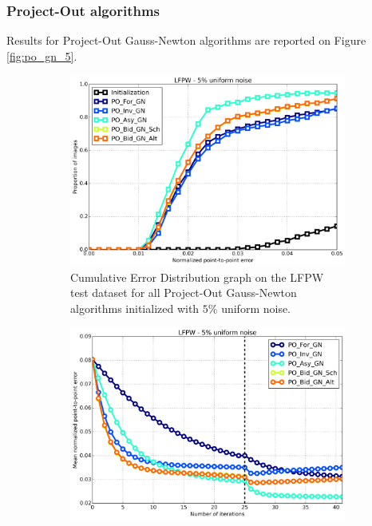 \subsubsection{Project-Out algorithms}


Results for Project-Out Gauss-Newton algorithms are reported on Figure \ref{fig:po_gn_5}.

\begin{figure}[h!]
	\centering
	\begin{subfigure}{0.48\textwidth}
	    \includegraphics[width=\textwidth]{experiments/algorithms/po_gn/ced_po_gn_5.png}
	    \caption{Cumulative Error Distribution graph on the LFPW test dataset for all Project-Out Gauss-Newton algorithms initialized with $5\%$ uniform noise.}
	    \label{fig:ced_po_gn_5}
	\end{subfigure}
	\hfill
	\begin{subfigure}{0.48\textwidth}
	    \includegraphics[width=\textwidth]{experiments/algorithms/po_gn/mean_error_vs_iters_po_gn_5.png}

\end{subfigure}
\end{figure}
